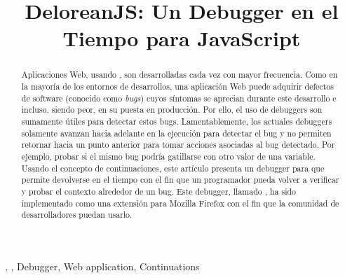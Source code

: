 \documentclass[conference]{IEEEtran}
\begin{document}
\title{DeloreanJS: Un Debugger en el Tiempo para JavaScript\\
}

\author{
\and
{}
\and
{}
}

\maketitle

\begin{abstract}
Aplicaciones Web, usando \javascript, son desarrolladas cada vez con mayor frecuencia. Como en la mayor\'ia de los entornos de desarrollos, una aplicaci\'on Web puede adquirir defectos de software (conocido como {\em bugs}) cuyos s\'intomas se aprecian durante este desarrollo e incluso, siendo peor, en su puesta en producci\'on. Por ello, el uso de debuggers son sumamente \'utiles para detectar estos bugs. Lamentablemente, los actuales debuggers solamente avanzan hacia adelante en la ejecuci\'on para detectar el bug y no permiten retornar hacia un punto anterior para tomar acciones asociadas al bug detectado. Por ejemplo, probar si el mismo bug podr\'ia gatillarse con otro valor de una variable. Usando el concepto de continuaciones, este art\'iculo presenta un debugger para \javascript que permite devolverse en el tiempo con el fin que un programador pueda volver a verificar y probar el contexto alrededor de un bug. Este debugger, llamado \deloreanjs, ha sido implementado como una extensi\'on para Mozilla Firefox con el fin que la comunidad de desarrolladores puedan usarlo.         
\end{abstract}

\begin{IEEEkeywords}
\deloreanjs, \javascript, Debugger, Web application, Continuations
\end{IEEEkeywords}
\end{document}
